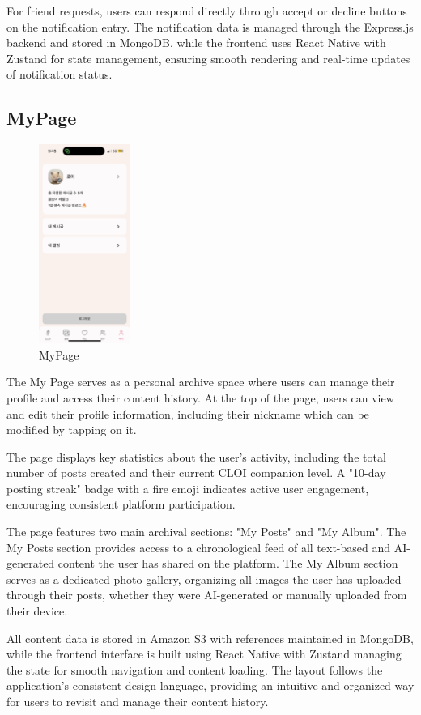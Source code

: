 \documentclass[conference]{IEEEtran}
\begin{document}
        For friend requests, users can respond directly through accept or decline buttons on the notification entry. The notification data is managed through the Express.js backend and stored in MongoDB, while the frontend uses React Native with Zustand for state management, ensuring smooth rendering and real-time updates of notification status.

  \subsection{MyPage}
        \begin{figure}[htbp]
            \centerline{\includegraphics[width=3cm]{Images/page/mypage.png}}
            \caption{MyPage}
            \label{fig}
        \end{figure}
        The My Page serves as a personal archive space where users can manage their profile and access their content history. At the top of the page, users can view and edit their profile information, including their nickname which can be modified by tapping on it.

        The page displays key statistics about the user's activity, including the total number of posts created and their current CLOI companion level. A "10-day posting streak" badge with a fire emoji indicates active user engagement, encouraging consistent platform participation.

        The page features two main archival sections: "My Posts" and "My Album". The My Posts section provides access to a chronological feed of all text-based and AI-generated content the user has shared on the platform. The My Album section serves as a dedicated photo gallery, organizing all images the user has uploaded through their posts, whether they were AI-generated or manually uploaded from their device.

        All content data is stored in Amazon S3 with references maintained in MongoDB, while the frontend interface is built using React Native with Zustand managing the state for smooth navigation and content loading. The layout follows the application's consistent design language, providing an intuitive and organized way for users to revisit and manage their content history.
\end{document}
